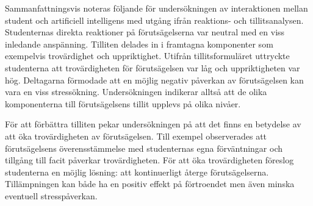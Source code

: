 Sammanfattningsvis noteras följande för undersökningen av interaktionen mellan student och artificiell intelligens med utgång ifrån reaktions- och tillitsanalysen. Studenternas direkta reaktioner på förutsägelserna var neutral med en viss inledande anspänning. Tilliten delades in i framtagna komponenter som exempelvis trovärdighet och uppriktighet. Utifrån tillitsformuläret uttryckte studenterna att trovärdigheten för förutsägelsen var låg och uppriktigheten var hög. Deltagarna förmodade att en möjlig negativ påverkan av förutsägelsen kan vara en viss stressökning. Undersökningen indikerar alltså att de olika komponenterna till förutsägelsens tillit upplevs på olika nivåer. 

För att förbättra tilliten pekar undersökningen på att det finns en betydelse av att öka trovärdigheten av förutsägelsen. Till exempel observerades att förutsägelsens överensstämmelse med studenternas egna förväntningar och tillgång till facit påverkar trovärdigheten. För att öka trovärdigheten föreslog studenterna en möjlig lösning: att kontinuerligt återge förutsägelserna. Tillämpningen kan både ha en positiv effekt på förtroendet men även minska eventuell stresspåverkan.




